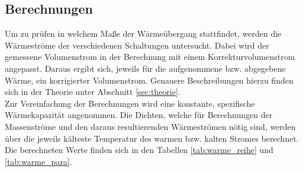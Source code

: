 \subsection{Berechnungen}
Um zu prüfen in welchem Maße der Wärmeübergang stattfindet, werden die Wärmeströme der verschiedenen Schaltungen untersucht. Dabei wird der gemessene Volumenstrom in der Berechnung mit einem Korrekturvolumenstrom angepasst. Daraus ergibt sich, jeweils für die aufgenommene bzw. abgegebene Wärme, ein korrigierter Volumenstrom. Genauere Beschreibungen hierzu finden sich in der Theorie unter Abschnitt \ref{sec:theorie}.\\
Zur Vereinfachung der Berechnungen wird eine konstante, spezifische Wärmekapazität angenommen. Die Dichten, welche für Berechnungen der Massenströme und den daraus resultierenden Wärmeströmen nötig sind, werden über die jeweils kälteste Temperatur des warmen bzw. kalten Stromes berechnet.\\
Die berechneten Werte finden sich in den Tabellen \ref{tab:warme_reihe} und \ref{tab:warme_para}.

\begin{table}[h!]
	\renewcommand*{\arraystretch}{1.2}
	\centering
	\caption{Berechnete Wärmeströme und Korrekturvolumenstrom für die Reihenschaltung}
	\label{tab:warme_reihe}%
\end{table}%
\FloatBarrier

